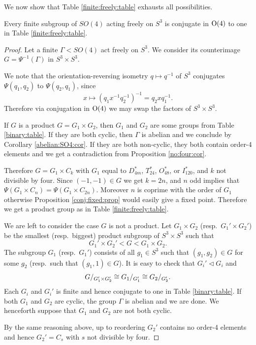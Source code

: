 We now show that Table \ref{finite:freely:table} exhausts all possibilities.

\begin{prop}
Every finite subgroup of $SO(4)$ acting freely on $S^3$ is conjugate in ${\rm O}(4)$ to one in Table \ref{finite:freely:table}.
\end{prop}
\begin{proof}
Let a finite $\Gamma < SO(4)$ act freely on $S^3$. We consider its counterimage $G = \Psi^{-1}(\Gamma)$ in $S^3\times S^3$. 

We note that the orientation-reversing isometry $q \mapsto q^{-1}$ of $S^3$ conjugates $\Psi(q_1,q_2)$ to $\Psi(q_2,q_1)$, since
$$x \longmapsto (q_1x^{-1}q_2^{-1})^{-1} = q_2xq_1^{-1}.$$
Therefore via conjugation in ${\rm O}(4)$ we may swap the factors of $S^3\times S^3$.

If $G$ is a product $G=G_1 \times G_2$, then $G_1$ and $G_2$ are some groups from Table \ref{binary:table}. If they are both cyclic, then $\Gamma$ is abelian and we conclude by Corollary \ref{abelian:SO4:cor}.
If they are both non-cyclic, they both contain order-4 elements and we get a contradiction from Proposition \ref{no:four:cor}.

Therefore $G = G_1 \times C_k$ with $G_1$ equal to $D_{4m}^*$, $T_{24}^*$, $O_{48}^*$, or $I_{120}^*$, and $k$ not divisible by four. Since $(-1,-1) \in G$ we get $k=2n$, and $n$ odd implies that $\Psi (G_1 \times C_n) = \Psi(G_1 \times C_{2n})$. Moreover $n$ is coprime with the order of $G_1$ otherwise Proposition \ref{conj:fixed:prop} would easily give a fixed point. Therefore we get a product group as in Table \ref{finite:freely:table}.

We are left to consider the case $G$ is not a product. Let $G_1 \times G_2$ (resp.~$G_1' \times G_2'$) be the smallest (resp.~biggest) product subgroup of $S^3\times S^3$ such that 
$$G_1' \times G_2' < G < G_1 \times G_2.$$
The subgroup $G_1$ (resp.~$G_1'$) consists of all $g_1\in S^3$ such that $(g_1,g_2) \in G$ for some $g_2$ (resp.~such that $(g_1,1)\in G$).
It is easy to check that $G_i'\triangleleft G_i$ and 
$${G}/_{G_1' \times G_2'} \cong {G_1}/_{G_1'} \cong {G_2}/_{G_2'}.$$
Each $G_i$ and $G_i'$ is finite and hence conjugate to one in Table \ref{binary:table}. 
If both $G_1$ and $G_2$ are cyclic, the group $\Gamma$ is abelian and we are done. We henceforth suppose that $G_1$ and $G_2$ are not both cyclic.

By the same reasoning above, up to reordering $G_2'$ contains no order-4 elements and hence $G_2' = C_s$ with $s$ not divisible by four. 


\end{proof}
